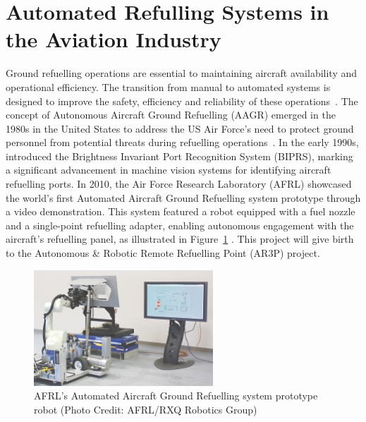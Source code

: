 \documentclass[12pt,oneside]{book} %
\begin{document}
\section{Automated Refulling Systems in the Aviation Industry}
Ground refuelling operations are essential to maintaining aircraft availability
and operational efficiency. The transition from manual to automated systems is
designed to improve the safety, efficiency and reliability of these
operations~\cite{ExpertSystemsAGR}. The concept of Autonomous Aircraft Ground
Refuelling (AAGR) emerged in the 1980s in the United States to address the US
Air Force’s need to protect ground personnel from potential threats during
refuelling operations~\cite{Schultz1986}. In the early 1990s,
\citet{Bennett1991} introduced the Brightness Invariant Port Recognition System
(BIPRS), marking a significant advancement in machine vision systems for
identifying aircraft refuelling ports. In 2010, the Air Force Research
Laboratory (AFRL) showcased the world’s first Automated Aircraft Ground
Refuelling system prototype through a video demonstration. This system featured
a robot equipped with a fuel nozzle and a single-point refuelling adapter,
enabling autonomous engagement with the aircraft's refuelling panel, as
illustrated in Figure~\ref{fig:test-2010} \cite{Burnette2010}. This project
will give birth to the Autonomous \& Robotic Remote Refuelling Point (AR3P)
project.

\begin{figure}[H]
    \centering
    \includegraphics[width=0.6\textwidth]{figures/test_2010.jpeg}
    \caption{AFRL's Automated Aircraft Ground Refuelling system prototype robot (Photo Credit: AFRL/RXQ Robotics Group)}\label{fig:test-2010}
    \label{fig:test-2010}
\end{figure}
\end{document}
